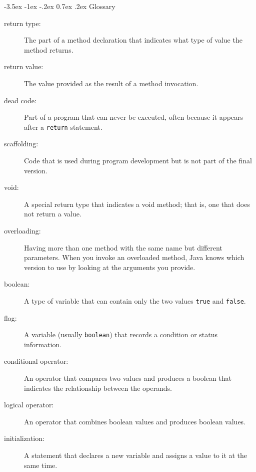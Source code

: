 \documentclass{book}
\makeatletter
\renewcommand{\section}{\@startsection 
    {section} {1} {0mm}%
    {-3.5ex \@plus -1ex \@minus -.2ex}%
    {0.7ex \@plus.2ex}%
    {\normalfont\Large\bfseries}}
\makeatother
\begin{document}
\section{Glossary}

\begin{description}

\item[return type:]  The part of a method declaration that indicates
what type of value the method returns.

\item[return value:]  The value provided as the result of a method
invocation.

\item[dead code:]  Part of a program that can never be executed,
often because it appears after a {\tt return} statement.

\item[scaffolding:]  Code that is used during program development
but is not part of the final version.

\item[void:]  A special return type that indicates a void method;
that is, one that does not return a value.

\item[overloading:]  Having more than one method with the same name
but different parameters.  When you invoke an overloaded method,
Java knows which version to use by looking at the arguments you
provide.

\item[boolean:]  A type of variable that can contain only the two
values {\tt true} and {\tt false}.

\item[flag:]  A variable (usually {\tt boolean}) that records
a condition or status information.

\item[conditional operator:]  An operator that compares two values
and produces a boolean that indicates the relationship between the
operands.

\item[logical operator:]  An operator that combines boolean values
and produces boolean values.

\item[initialization:]  A statement that declares a new variable
and assigns a value to it at the same time.


\end{description}
\end{document}
